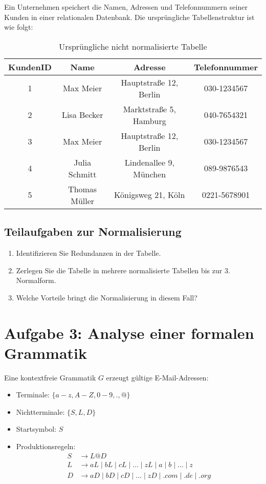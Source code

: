 \documentclass[a4paper,12pt]{article}
\begin{document}
	Ein Unternehmen speichert die Namen, Adressen und Telefonnummern seiner Kunden in einer relationalen Datenbank. Die ursprüngliche Tabellenstruktur ist wie folgt:
	
	\begin{table}[h]
		\centering
		\caption{Ursprüngliche nicht normalisierte Tabelle}
		\begin{tabular}{|c|c|c|c|}
			\hline
			KundenID & Name & Adresse & Telefonnummer \\
			\hline
			1 & Max Meier & Hauptstraße 12, Berlin & 030-1234567 \\
			2 & Lisa Becker & Marktstraße 5, Hamburg & 040-7654321 \\
			3 & Max Meier & Hauptstraße 12, Berlin & 030-1234567 \\
			4 & Julia Schmitt & Lindenallee 9, München & 089-9876543 \\
			5 & Thomas Müller & Königsweg 21, Köln & 0221-5678901 \\
			\hline
		\end{tabular}
	\end{table}
	
	\subsection*{Teilaufgaben zur Normalisierung}
	\begin{enumerate}
		\item Identifizieren Sie Redundanzen in der Tabelle.
		\item Zerlegen Sie die Tabelle in mehrere normalisierte Tabellen bis zur 3. Normalform.
		\item Welche Vorteile bringt die Normalisierung in diesem Fall?
	\end{enumerate}
	
	\section*{Aufgabe 3: Analyse einer formalen Grammatik}
	
	Eine kontextfreie Grammatik \( G \) erzeugt gültige E-Mail-Adressen:
	\begin{itemize}
		\item Terminale: \( \{a-z, A-Z, 0-9, ., @\} \)
		\item Nichtterminale: \( \{S, L, D\} \)
		\item Startsymbol: \( S \)
		\item Produktionsregeln:
		\begin{align*}
			S &\to L @ D \\
			L &\to aL \mid bL \mid cL \mid \dots \mid zL \mid a \mid b \mid \dots \mid z \\
			D &\to aD \mid bD \mid cD \mid \dots \mid zD \mid .com \mid .de \mid .org
		\end{align*}
	\end{itemize}
	
\end{document}
